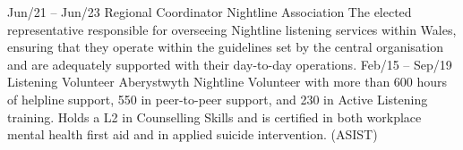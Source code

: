 \documentclass[9pt]{developercv} %
\begin{document}
\vspace{-10 pt}
\begin{entrylist}
	\entry
        {Jun/21 -- Jun/23}
		{Regional Coordinator}
		{Nightline Association}
		{The elected representative responsible for overseeing Nightline listening services within Wales, ensuring that they operate within the guidelines set by the central organisation and are adequately supported with their day-to-day operations.}
	\entry
		{Feb/15 -- Sep/19}
		{Listening Volunteer}
		{Aberystwyth Nightline}
		{Volunteer with more than 600 hours of helpline support, 550 in peer-to-peer support, and 230 in Active Listening training. Holds a L2 in Counselling Skills and is certified in both workplace mental health first aid and in applied suicide intervention. (ASIST)}
\end{entrylist}
\end{document}
